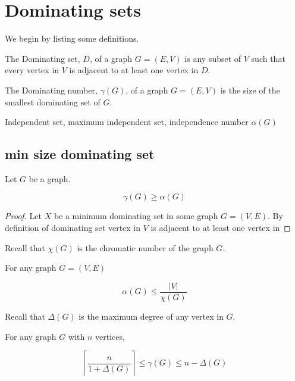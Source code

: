 \chapter{Dominating sets}

We begin by listing some definitions.

\begin{definition}
    The Dominating set, $D$, of a graph $G=(E,V)$ is any subset of $V$ such that every vertex in $V$ is adjacent to at least one vertex in $D$.
\end{definition}

\begin{definition}
    The Dominating number, $\gamma(G)$, of a graph $G=(E,V)$ is the size of the smallest dominating set of $G$.
\end{definition}

\begin{definition}
    Independent set, maximum independent set, independence number $\alpha(G)$
\end{definition}

\section{min size dominating set}

\begin{lemma}
    Let $G$ be a graph. 
        
    \[\gamma(G) \geq \alpha(G)\]
\end{lemma}

\begin{proof}
    Let $X$ be a minimum dominating set in some graph $G=(V,E)$. By definition of dominating set vertex in $V$ is adjacent to at least one vertex in      
\end{proof}
    
Recall that $\chi(G)$ is the chromatic number of the graph $G$.

\begin{theorem} [Willis 2011 3.1] 
    For any graph $G = (V,E)$ \cite{Willis2011BoundsFT}

    \[\alpha(G) \leq \frac{ \left | {V} \right |}{\chi(G)}\]
\end{theorem}

Recall that $\Delta(G)$ is the maximum degree of any vertex in $G$.

\begin{theorem} [Balakrishnan 2012 10.3.2] \label{balakrishnan201210.3.2}\cite{balakrishnan2012}
    For any graph $G$ with $n$ vertices, 
    
    \[ \left\lceil {\frac{n}{1+\Delta(G)}} \right\rceil \leq \gamma(G) \leq n - \Delta(G)\]    
\end{theorem}
    
